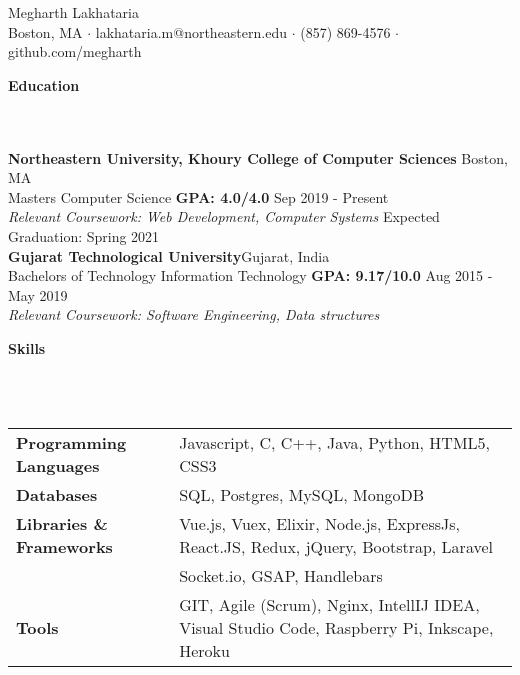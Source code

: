 \documentclass[]{article}
\newcommand{\lineunder} {
    \vspace*{-8pt} \\
    \hrulefill \\
}
\newcommand{\header} [1] {
    {\vspace*{6pt} \fontsize{12}{12}\selectfont \textbf{#1}}
     \lineunder
}
\begin{document}
\vspace*{-40pt}

    

\begin{center}
	{\LARGE {Megharth Lakhataria}}\\
	Boston, MA $\cdot$ lakhataria.m@northeastern.edu $\cdot$ (857) 869-4576 $\cdot$ github.com/megharth\\
\end{center}

\header{Education}
\hspace{1mm}
\textbf{Northeastern University, Khoury College of Computer Sciences}
\hfill
Boston, MA\\
\hspace{1mm}
Masters Computer Science \textbf{GPA: 4.0/4.0} \hfill Sep 2019 - Present\\
\hspace{1mm}
\textit{Relevant Coursework: Web Development, Computer Systems} \hfill Expected Graduation: Spring 2021\\
\vspace{1mm}
\hspace{1mm}
\textbf{Gujarat Technological University}\hfill Gujarat, India\\
\hspace{1mm}
Bachelors of Technology Information Technology \textbf{GPA: 9.17/10.0}  \hfill Aug 2015 - May 2019 \\
\hspace{1mm}
\textit{Relevant Coursework: Software Engineering, Data structures} \\
\vspace{1mm}


\header{Skills}
\vspace{1mm}
\begin{tabular}{ l l }
	\textbf{Programming Languages} & Javascript, C, C++, Java, Python, HTML5, CSS3            \\
	\textbf{Databases}             & SQL, Postgres, MySQL, MongoDB                            \\
    
    \textbf{Libraries \& Frameworks}             & Vue.js, Vuex, Elixir, Node.js, ExpressJs, React.JS,
    Redux, jQuery, Bootstrap, Laravel  \\
                          & Socket.io, GSAP, Handlebars \\
    
    \textbf{Tools}                & GIT, Agile (Scrum), Nginx, IntellIJ IDEA, Visual Studio Code,
    Raspberry Pi, Inkscape, Heroku \\          
\end{tabular}
\end{document}

